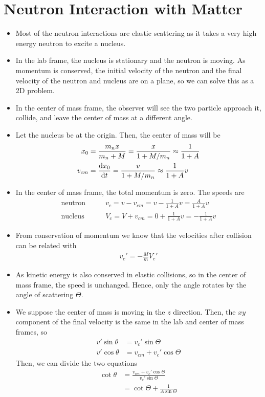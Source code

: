 \documentclass[a4paper]{article}
\begin{document}
\section{Neutron Interaction with Matter}
\begin{itemize}
    \item Most of the neutron interactions are elastic scattering as it takes a very high energy neutron to excite a nucleus.
    \item In the lab frame, the nucleus is stationary and the neutron is moving. As momentum is conserved, the initial velocity of the neutron and the final velocity of the neutron and nucleus are on a plane, so we can solve this as a 2D problem.
    \item In the center of mass frame, the observer will see the two particle approach it, collide, and leave the center of mass at a different angle.
    \item Let the nucleus be at the origin. Then, the center of mass will be \begin{align}
        x_0&=\frac{m_nx}{m_n+M}=\frac{x}{1+M/m_n}\approx\frac{1}{1+A}\\
        v_{cm}&=\derivative{x_0}{t}=\frac{v}{1+M/m_n}\approx\frac{1}{1+A}v
    \end{align}
    \item In the center of mass frame, the total momentum is zero. The speeds are \begin{align}
        \text{neutron}&\qquad v_{c}=v-v_{cm}=v-\frac{1}{1+A}v=\frac{A}{1+A}v\\
        \text{nucleus}&\qquad V_{c}=V+v_{cm}=0+\frac{1}{1+A}v=-\frac{1}{1+A}v
    \end{align}
    \item From conservation of momentum we know that the velocities after collision can be related with \begin{align}
        v_c'=-\frac{M}{m}V_c'
    \end{align}
    \item As kinetic energy is also conserved in elastic collisions, so in the center of mass frame, the speed is unchanged. Hence, only the angle rotates by the angle of scattering $\Theta.$
    \item We suppose the center of mass is moving in the $z$ direction. Then, the $xy$ component of the final velocity is the same in the lab and center of mass frames, so \begin{align}
        v'\sin\theta&=v_c'\sin\Theta\\
        v'\cos\theta&=v_{cm}+v_c'\cos\Theta
    \end{align}
    Then, we can divide the two equations \begin{align}
        \cot\theta&=\frac{v_{cm}+v_c'\cos\Theta}{v_c'\sin\Theta}\\
        &=\cot\Theta+\frac{1}{A\sin\Theta}
    \end{align}
\end{itemize}
\end{document}
